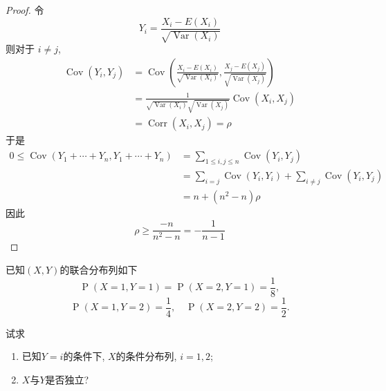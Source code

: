\documentclass[../main.tex]{subfiles}
\begin{document}
\begin{proof}
  令 \[
  Y_{i}= \frac{X_{i}-E\left( X_{i} \right)  }{\sqrt{\operatorname{Var}\left( X_{i} \right) } } 
  \]则对于 \(  i\neq j  \),  \[
  \begin{aligned}
  \operatorname{Cov}\left( Y_i,Y_{j} \right)&= \operatorname{Cov}\left( \frac{X_{i}-E\left( X_{i} \right)  }{\sqrt{\operatorname{Var}\left( X_{i} \right) } },\frac{X_{j}-E\left( X_{j} \right)  }{\sqrt{\operatorname{Var}\left( X_{j} \right)}  }   \right)  \\ 
   &= \frac{1 }{\sqrt{\operatorname{Var}\left( X_{i} \right) }\sqrt{\operatorname{Var}\left( X_{j} \right) } } \operatorname{Cov}\left( X_{i},X_{j} \right)\\ 
    &= \operatorname{Corr}\left( X_{i},X_{j} \right)= \rho   
  \end{aligned}
  \] 于是 \[
  \begin{aligned}
  0\le \operatorname{Cov}\left( Y_1+ \cdots + Y_{n},Y_1+ \cdots + Y_{n} \right)&= \sum _{1\le i,j\le n}\operatorname{Cov}\left( Y_{i},Y_{j} \right) \\ 
   &= \sum _{i= j}\operatorname{Cov}\left( Y_{i},Y_{i} \right)+ \sum _{i\neq j}\operatorname{Cov}\left( Y_{i},Y_{j} \right)\\ 
    &= n+ \left( n^{2}-n \right)\rho    
  \end{aligned}
  \]因此 \[
  \rho \ge \frac{-n }{n^{2}-n }= -\frac{1 }{n-1 }  
  \]
\end{proof}

\begin{exercise}{}{}
已知\((X,Y)\)的联合分布列如下
\[
\operatorname{P}(X=1,Y=1)=\operatorname{P}(X=2,Y=1)=\frac18,
\]
\[
\operatorname{P}(X=1,Y=2)=\frac14,\quad \operatorname{P}(X=2,Y=2)=\frac12.
\]

试求

\begin{enumerate}
  \item 已知\(Y=i\)的条件下, \(X\)的条件分布列, \(i=1,2\);
  \item \(X\)与\(Y\)是否独立?
\end{enumerate}
\end{exercise}
\end{document}
